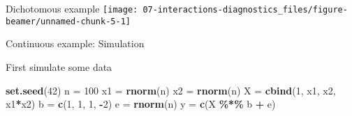 \documentclass[
  ignorenonframetext,
]{beamer}
\newenvironment{Shaded}{\begin{snugshade}}{\end{snugshade}}
\newcommand{\DecValTok}[1]{\textcolor[rgb]{0.00,0.00,0.81}{#1}}
\newcommand{\FunctionTok}[1]{\textcolor[rgb]{0.13,0.29,0.53}{\textbf{#1}}}
\newcommand{\NormalTok}[1]{#1}
\newcommand{\OtherTok}[1]{\textcolor[rgb]{0.56,0.35,0.01}{#1}}
\newcommand{\SpecialCharTok}[1]{\textcolor[rgb]{0.81,0.36,0.00}{\textbf{#1}}}
\begin{document}
\begin{frame}{Dichotomous example}
\label{dichotomous-example}
\texttt{[image: 07-interactions-diagnostics\_files/figure-beamer/unnamed-chunk-5-1]}
\end{frame}

\begin{frame}[fragile]{Continuous example: Simulation}
\label{continuous-example-simulation}
\pause

First simulate some data

\begin{Shaded}
\begin{Highlighting}[]
\FunctionTok{set.seed}\NormalTok{(}\DecValTok{42}\NormalTok{)}
\NormalTok{n  }\OtherTok{=} \DecValTok{100}
\NormalTok{x1 }\OtherTok{=} \FunctionTok{rnorm}\NormalTok{(n)}
\NormalTok{x2 }\OtherTok{=} \FunctionTok{rnorm}\NormalTok{(n)}
\NormalTok{X  }\OtherTok{=} \FunctionTok{cbind}\NormalTok{(}\DecValTok{1}\NormalTok{, x1, x2, x1}\SpecialCharTok{*}\NormalTok{x2)}
\NormalTok{b  }\OtherTok{=} \FunctionTok{c}\NormalTok{(}\DecValTok{1}\NormalTok{, }\DecValTok{1}\NormalTok{, }\DecValTok{1}\NormalTok{, }\SpecialCharTok{{-}}\DecValTok{2}\NormalTok{)}
\NormalTok{e  }\OtherTok{=} \FunctionTok{rnorm}\NormalTok{(n)}
\NormalTok{y  }\OtherTok{=} \FunctionTok{c}\NormalTok{(X }\SpecialCharTok{\%*\%}\NormalTok{ b }\SpecialCharTok{+}\NormalTok{ e)}
\end{Highlighting}
\end{Shaded}
\end{frame}
\end{document}
